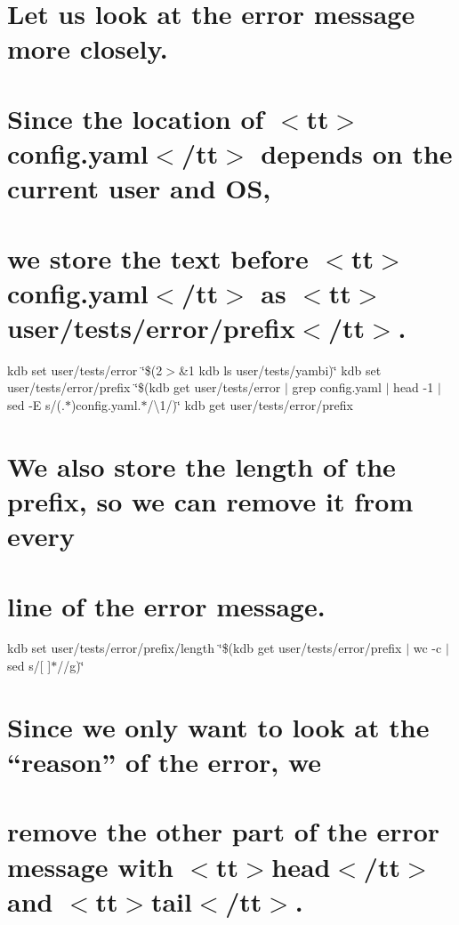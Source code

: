 \hypertarget{autotoc_md753_autotoc_md769}{}\section{Let us look at the error message more closely.}\label{autotoc_md753_autotoc_md769}
\hypertarget{autotoc_md753_autotoc_md770}{}\section{Since the location of $<$tt$>$config.\+yaml$<$/tt$>$ depends on the current user and O\+S,}\label{autotoc_md753_autotoc_md770}
\hypertarget{autotoc_md753_autotoc_md771}{}\section{we store the text before $<$tt$>$config.\+yaml$<$/tt$>$ as $<$tt$>$user/tests/error/prefix$<$/tt$>$.}\label{autotoc_md753_autotoc_md771}
kdb set user/tests/error \char`\"{}\$(2$>$\&1 kdb ls user/tests/yambi)\char`\"{} kdb set user/tests/error/prefix \char`\"{}\$(kdb get user/tests/error $\vert$ grep \textquotesingle{}config.\+yaml\textquotesingle{} $\vert$ head -\/1 $\vert$ sed -\/\+E \textquotesingle{}s/(.$\ast$)config.\+yaml.$\ast$/\textbackslash{}1/\textquotesingle{})\char`\"{} kdb get user/tests/error/prefix \hypertarget{autotoc_md753_autotoc_md772}{}\section{We also store the length of the prefix, so we can remove it from every}\label{autotoc_md753_autotoc_md772}
\hypertarget{autotoc_md753_autotoc_md773}{}\section{line of the error message.}\label{autotoc_md753_autotoc_md773}
kdb set user/tests/error/prefix/length \char`\"{}\$(kdb get user/tests/error/prefix $\vert$ wc -\/c $\vert$ sed \textquotesingle{}s/\mbox{[} \mbox{]}$\ast$//g\textquotesingle{})\char`\"{}\hypertarget{autotoc_md753_autotoc_md774}{}\section{Since we only want to look at the “reason” of the error, we}\label{autotoc_md753_autotoc_md774}
\hypertarget{autotoc_md753_autotoc_md775}{}\section{remove the other part of the error message with $<$tt$>$head$<$/tt$>$ and $<$tt$>$tail$<$/tt$>$.}\label{autotoc_md753_autotoc_md775}
